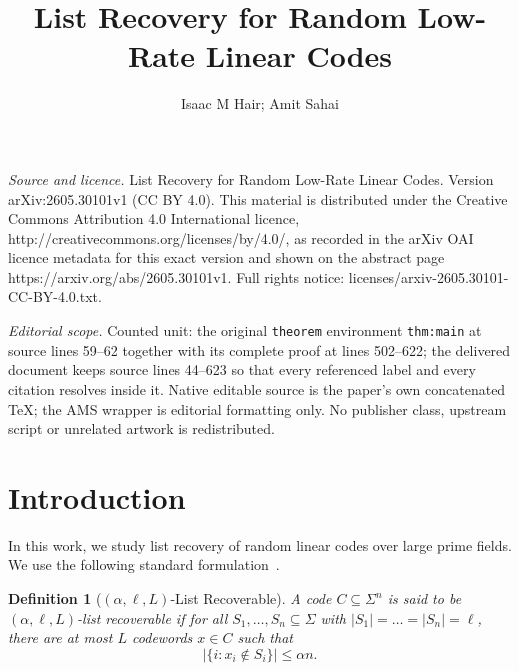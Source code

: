 \documentclass[10pt,a4paper]{amsart}
\newtheorem{definition}[theorem]{Definition}
\begin{document}
\title[List Recovery for Random Low-Rate Linear Codes]{List Recovery for Random Low-Rate Linear Codes}
\author{Isaac M Hair; Amit Sahai}
\date{}
\maketitle
\noindent\emph{Source and licence.} List Recovery for Random Low-Rate Linear Codes. Version arXiv:2605.30101v1 (CC BY 4.0). This material is distributed under the Creative Commons Attribution 4.0 International licence, http://creativecommons.org/licenses/by/4.0/, as recorded in the arXiv OAI licence metadata for this exact version and shown on the abstract page https://arxiv.org/abs/2605.30101v1. Full rights notice: licenses/arxiv-2605.30101-CC-BY-4.0.txt.\par\smallskip
\noindent\textit{Editorial scope.} Counted unit: the original \texttt{theorem} environment \texttt{thm:main} at source lines 59--62 together with its complete proof at lines 502--622; the delivered document keeps source lines 44--623 so that every referenced label and every citation resolves inside it. Native editable source is the paper's own concatenated TeX; the AMS wrapper is editorial formatting only. No publisher class, upstream script or unrelated artwork is redistributed.
\section{Introduction}

In this work, we study list recovery of random linear codes over large prime fields. We use the following standard formulation~\cite{ReschVenkitesh}.

\begin{definition}[$(\alpha, \ell, L)$-List Recoverable]\label{def:list-recoverable}
    A code $C \subseteq \Sigma^n$ is said to be $(\alpha, \ell, L)$-list recoverable if for all $S_1, \ldots, S_n \subseteq \Sigma$ with $\vert S_1 \vert = \ldots = \vert S_n\vert = \ell$, there are at most $L$ codewords $x \in C$ such that
    \[\vert \{ i : x_i \not\in S_i\}\vert \leq \alpha n.\]
\end{definition}
\end{document}
